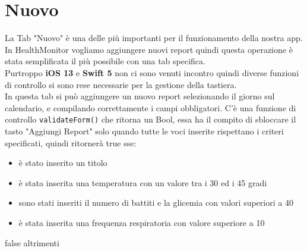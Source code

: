 \documentclass{article}
\begin{document}

\newpage
\section{Nuovo}

La Tab "Nuovo" è una delle più importanti per il funzionamento della nostra app. In HealthMonitor vogliamo aggiungere nuovi report quindi questa operazione è stata semplificata il più possibile con una tab specifica. \\
Purtroppo  \textbf{iOS 13} e \textbf{Swift 5} non ci sono venuti incontro quindi diverse funzioni di controllo si sono rese necessarie per la gestione della tastiera. \\
In questa tab si può aggiungere un nuovo report selezionando il giorno sul calendario, e compilando correttamente i campi obbligatori. C'è una funzione di controllo \texttt{validateForm()} che ritorna un Bool, essa ha il compito di sbloccare il tasto "Aggiungi Report" solo quando tutte le voci inserite rispettano i criteri specificati, quindi ritornerà true sse: 
\begin{itemize}
  \item è stato inserito un titolo
  \item è stata inserita una temperatura con un valore tra i 30 ed i 45 gradi
  \item sono stati inseriti il numero di battiti e la glicemia con valori superiori a 40
  \item è stata inserita una frequenza respiratoria con valore superiore a 10 
\end{itemize}
false altrimenti
\end{document}
